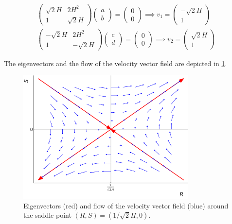 \begin{align}
    \begin{pmatrix}
        \sqrt{2}H & 2H^2 \\
        1 & \sqrt{2}H
    \end{pmatrix} 
    \begin{pmatrix}
        a \\ b
    \end{pmatrix} 
    = \begin{pmatrix}
        0 \\ 0
    \end{pmatrix} \implies
    v_1 = \begin{pmatrix}
        -\sqrt{2}H \\ 1
    \end{pmatrix}
    \\
    \begin{pmatrix}
        -\sqrt{2}H & 2H^2 \\
        1 & -\sqrt{2}H
    \end{pmatrix} 
    \begin{pmatrix}
        c \\ d
    \end{pmatrix} 
    = \begin{pmatrix}
        0 \\ 0
    \end{pmatrix} \implies
    v_2 = \begin{pmatrix}
        \sqrt{2}H \\ 1
    \end{pmatrix}
\end{align}

\noindent
The eigenvectors and the flow of the velocity vector field are depicted in \cref{fig:eigvec_saddle}.

\begin{figure}[h]
    \centering
    \includegraphics[width = 0.8\textwidth]{Pictures/saddle.pdf}
\caption{Eigenvectors (red) and flow of the velocity vector field (blue) around the saddle point $(R, S) = (1/\sqrt{2} H, 0)$.}
\label{fig:eigvec_saddle}
\end{figure}

